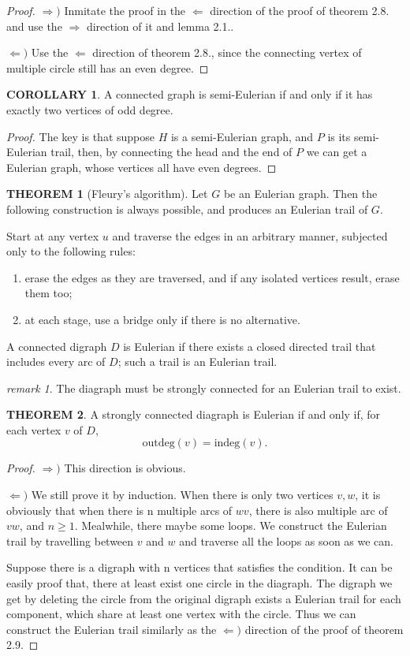 \documentclass[a4paper,11pt]{article}%
\theoremstyle{remark}
\newtheorem*{remark}{remark}
\theoremstyle{definition}
\newtheorem{theorem}{THEOREM}[section]
\theoremstyle{definition}
\newtheorem{corollary}{COROLLARY}[section]
\theoremstyle{definition}
\theoremstyle{definition}
\theoremstyle{plain}
\theoremstyle{definition}
\begin{document}
\begin{proof}
$\Rightarrow)$ Inmitate the proof in the $\Leftarrow$ direction of the proof of 
theorem 2.8. and use the $\Rightarrow$ direction of it and lemma 2.1..

$\Leftarrow)$ Use the $\Leftarrow$ direction of theorem 2.8., since the connecting
vertex of multiple circle still has an even degree.
\end{proof}
\begin{corollary}
    A connected graph is semi-Eulerian if and only if it has exactly two vertices of odd
    degree.
\end{corollary}
\begin{proof}
    The key is that suppose $H$ is a semi-Eulerian graph, and 
    $P$ is its semi-Eulerian trail, then, by connecting the head and the end 
    of $P$ we can get a Eulerian graph, whose vertices all have even degrees.
\end{proof}
\begin{theorem}[Fleury's algorithm]
   Let $G$ be an Eulerian graph. Then the following construction is always 
   possible, and produces an Eulerian trail of $G$.
   
   Start at any vertex $u$ and traverse the edges in an arbitrary manner,
   subjected only to the following rules:
   \begin{enumerate}
    \item erase the edges as they are traversed, and if any isolated vertices result, erase them too;
    \item at each stage, use a bridge only if there is no alternative.
   \end{enumerate}
\end{theorem}
A connected digraph $D$ is Eulerian if there exists a closed directed trail 
that includes every arc of $D$; such a trail is an Eulerian trail.
\begin{remark}
    The diagraph must be strongly connected for an Eulerian trail to exist.
\end{remark}
\begin{theorem}
    A strongly connected diagraph is Eulerian if and only if, for each vertex 
    $v$ of $D$,
    \[ \text{outdeg}(v)=\text{indeg}(v).\]
\end{theorem}
\begin{proof}
    $\Rightarrow)$ This direction is obvious.

    $\Leftarrow)$ We still prove it by induction.
    When there is only two vertices $v,w$, it is obviously that 
    when there is n multiple arcs of $wv$, there is also multiple arc of $vw$,
    and $n\geq 1$. Mealwhile, there maybe some loops. We construct the Eulerian 
    trail by travelling between $v$ and $w$ and traverse all the loops as 
    soon as we can.

    Suppose there is a digraph with n vertices that satisfies the condition.
    It can be easily proof that, there at least exist one circle in 
    the diagraph. The digraph we get by deleting the circle from the 
    original digraph exists a Eulerian trail for each component, which share 
    at least one vertex with the circle. Thus we can construct the 
    Eulerian trail similarly as the $\Leftarrow)$ direction of the
    proof of theorem 2.9.
\end{proof}
\end{document}
